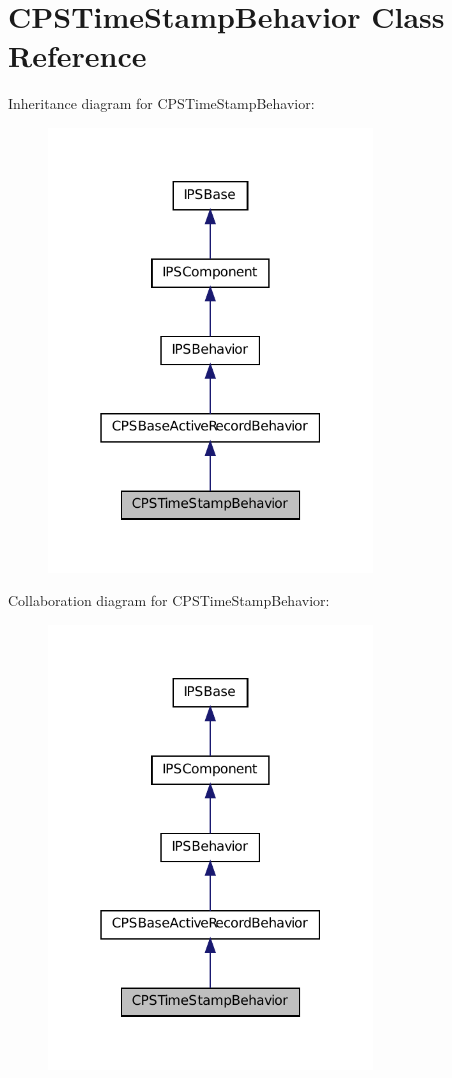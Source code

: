 \hypertarget{classCPSTimeStampBehavior}{
\section{CPSTimeStampBehavior Class Reference}
\label{classCPSTimeStampBehavior}
}


Inheritance diagram for CPSTimeStampBehavior:\nopagebreak
\begin{figure}[H]
\begin{center}
\leavevmode
\includegraphics[width=244pt]{classCPSTimeStampBehavior__inherit__graph}
\end{center}
\end{figure}


Collaboration diagram for CPSTimeStampBehavior:\nopagebreak
\begin{figure}[H]
\begin{center}
\leavevmode
\includegraphics[width=244pt]{classCPSTimeStampBehavior__coll__graph}
\end{center}
\end{figure}
